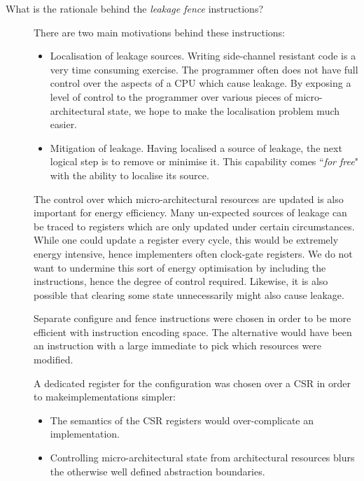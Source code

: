 \begin{description}
\item[What is the rationale behind the {\em leakage fence} instructions?]
    \label{sec:design:analog-leakage}

    There are two main motivations behind these instructions:

    \begin{itemize}

    \item
    Localisation of leakage sources.
    Writing side-channel resistant code is a very time consuming exercise.
    The programmer often does not have full control over the aspects of
    a CPU which cause leakage.
    By exposing a level of control to the programmer over various
    pieces of micro-architectural state, we hope to make the localisation
    problem much easier.

    \item
    Mitigation of leakage.
    Having localised a source of leakage, the next logical step is to
    remove or minimise it.
    This capability comes ``{\em for free}" with the ability to localise
    its source.

    \end{itemize}

    The control over which micro-architectural resources are updated
    is also important for energy efficiency.
    Many un-expected sources of leakage can be traced to registers which
    are only updated under certain circumstances.
    While one could update a register every cycle, this would be extremely
    energy intensive, hence implementers often clock-gate registers.
    We do not want to undermine this sort of energy optimisation by
    including the instructions, hence the degree of control required.
    Likewise, it is also possible that clearing some state unnecessarily
    might also cause leakage.

    Separate configure and fence instructions were chosen in order to be
    more efficient with instruction encoding space.
    The alternative would have been an instruction with a large immediate
    to pick which resources were modified.

    A dedicated register for the configuration was chosen over a CSR in
    order to makeimplementations simpler:

    \begin{itemize}
    \item The semantics of the CSR registers would over-complicate an
    implementation.

    \item Controlling micro-architectural state from architectural
    resources blurs the otherwise well defined abstraction boundaries.
    \end{itemize}

\end{description}

